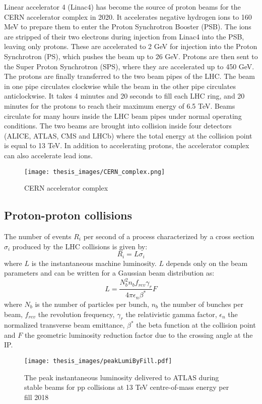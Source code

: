 \documentclass[a4paper, oneside, 11pt, openright]{book}
\begin{document}
				Linear accelerator 4 (Linac4) has become the source of proton beams for the CERN accelerator complex in 2020. It accelerates negative hydrogen ions to 160 MeV to prepare them to enter the Proton Synchrotron Booster (PSB). The ions are stripped of their two electrons during injection from Linac4 into the PSB, leaving only protons. These are accelerated to 2 GeV for injection into the Proton Synchrotron (PS), which pushes the beam up to 26 GeV. Protons are then sent to the Super Proton Synchrotron (SPS), where they are accelerated up to 450 GeV. The protons are finally transferred to the two beam pipes of the LHC. The beam in one pipe circulates clockwise while the beam in the other pipe circulates anticlockwise. It takes 4 minutes and 20 seconds to fill each LHC ring, and 20 minutes for the protons to reach their maximum energy of 6.5 TeV. Beams circulate for many hours inside the LHC beam pipes under normal operating conditions. The two beams are brought into collision inside four detectors (ALICE, ATLAS, CMS and LHCb) where the total energy at the collision point is equal to 13 TeV. In addition to accelerating protons, the accelerator complex can also accelerate lead ions.
				
				\begin{figure}
					\centering
					\texttt{[image: thesis\_images/CERN\_complex.png]}
					\caption{CERN accelerator complex}
					\label{fig:CERN_complex}
				\end{figure}
			
			\subsection{Proton-proton collisions}
				The number of events $R_{i}$ per second of a process characterized by a cross section $\sigma_{i}$ produced by the LHC collisions is given by:
				$$
				R_{i} = L\sigma_{i}
				$$
				where $L$ is the instantaneous machine luminosity. $L$ depends only on the beam parameters and can be written for a Gaussian beam distribution as: 
				$$
				L = \frac{N_b^2n_bf_{rev}\gamma_r}{4\pi\epsilon_n\beta^*}F
				$$
				where $N_b$ is the number of particles per bunch, $n_b$ the number of bunches per beam, $f_{rev}$ the revolution frequency, $\gamma_r$ the relativistic gamma factor, $\epsilon_n$ the normalized transverse beam emittance, $\beta^*$ the beta function at the collision point and $F$ the geometric luminosity reduction factor due to the crossing angle at the IP. 
				
				\begin{figure}
					\centering
					\texttt{[image: thesis\_images/peakLumiByFill.pdf]}
					\caption{The peak instantaneous luminosity delivered to ATLAS during stable beams for pp collisions at 13 TeV centre-of-mass energy per fill 2018}
					\label{fig:insta lum}
				\end{figure}
				
\end{document}
